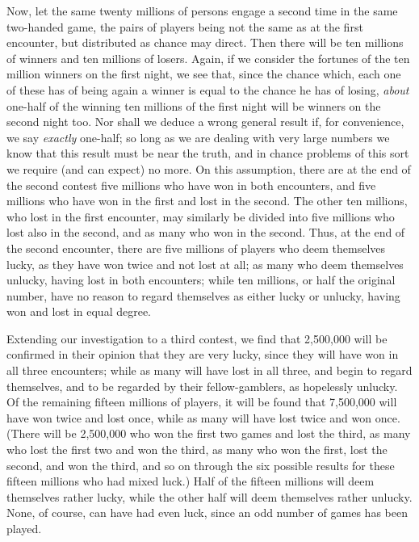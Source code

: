 \documentclass[letterpaper,12pt,oneside,openany]{memoir}
\begin{document}
Now, let the same twenty millions of persons engage
a second time in the same two-handed game, the pairs
of players being not the same as at the first encounter,
but distributed as chance may direct. Then there will
be ten millions of winners and ten millions of losers.
Again, if we consider the fortunes of the ten million
winners on the first night, we see that, since the chance
which, each one of these has of being again a winner is
equal to the chance he has of losing, \textit{about} one-half of
the winning ten millions of the first night will be winners
on the second night too. Nor shall we deduce a
wrong general result if, for convenience, we say \textit{exactly}
one-half; so long as we are dealing with very large
numbers we know that this result must be near the
truth, and in chance problems of this sort we require
(and can expect) no more. On this assumption, there
are at the end of the second contest five millions who
have won in both encounters, and five millions who have
won in the first and lost in the second. The other ten
millions, who lost in the first encounter, may similarly
be divided into five millions who lost also in the second,
and as many who won in the second. Thus, at the end
of the second encounter, there are five millions of
players who deem themselves lucky, as they have won
twice and not lost at all; as many who deem themselves
unlucky, having lost in both encounters; while ten
millions, or half the original number, have no reason
to regard themselves as either lucky or unlucky, having
won and lost in equal degree.

Extending our investigation to a third contest, we
find that 2,500,000 will be confirmed in their opinion
that they are very lucky, since they will have won in all
three encounters; while as many will have lost in all
three, and begin to regard themselves, and to be regarded
by their fellow-gamblers, as hopelessly unlucky.
Of the remaining fifteen millions of players, it will be
found that 7,500,000 will have won twice and lost once,
while as many will have lost twice and won once.
(There will be 2,500,000 who won the first two games
and lost the third, as many who lost the first two and
won the third, as many who won the first, lost the
second, and won the third, and so on through the six
possible results for these fifteen millions who had mixed
luck.) Half of the fifteen millions will deem themselves
rather lucky, while the other half will deem
themselves rather unlucky. None, of course, can have
had even luck, since an odd number of games has been
played.
\end{document}
